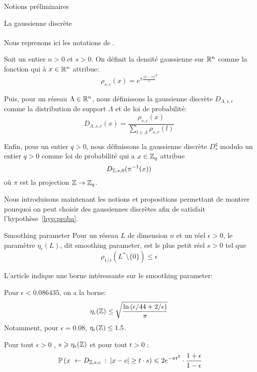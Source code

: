 \begin{section}{Notions préliminaires}
\begin{subsection}{La gaussienne discrète}
	\paragraph{}
Nous reprenons ici les notations de \cite{STOC:GenPeiVai08}.

Soit un entier $n > 0$  et $s > 0$. On définit la densité gaussienne sur $\mathbb{R}^n$ comme la fonction qui à $x\in\mathbb{R}^n$
attribue:
\[\rho_{s,c}(x) = e^{\pi {\frac{||x-c||}{s}}^2} \]

Puis, pour un réseau $\Lambda \in \mathbb{R}^n$, nous définissons la gaussienne discrète $D_{\Lambda,s,c}$ comme la
distribution de support $\Lambda$ et de loi de probabilité: 	
\[ D_{\Lambda, s, c}(x) = \frac{\rho_{s,c}(x)}{\sum_{l\in \Lambda}\rho_{s,c}(l)}\]

Enfin, pour un entier $q > 0$, nous définissons la gaussienne discrète $D^q_{s}$ modulo un entier $q > 0$ comme loi de
probabilité qui a $x \in \mathbb{Z}_q$ attribue 
	\[ D_{\mathbb{Z}, s, 0}(\pi^{-1}(x)) \]
où $\pi$ est la projection $\mathbb{Z} \rightarrow \mathbb{Z}_q$.


Nous introduisons maintenant les notions et propositions permettant de montrer pourquoi on peut choisir 
des gaussiennes discrètes afin de satisfait l'hypothèse~\ref{hyp:proba}.

\begin{definition}{Smoothing parameter}
Pour un réseau $L$ de dimension $n$ et un réel $\epsilon > 0$, le paramètre $\eta_\epsilon(L)$, dit smoothing parameter,
est le plus petit réel $s>0$ tel que 
	\[\rho_{1/s}(L^* \setminus \{0\}) \leqslant \epsilon\]
\end{definition}

L'article \cite{cryptoeprint:2018:786} indique une borne intéressante sur le smoothing parameter:
\begin{prop}
Pour $\epsilon < 0.086435$, on a la borne:
\[\eta_{\epsilon}(\mathbb{Z})  \leq \sqrt{\frac{\ln\left(\epsilon/44 + 2/\epsilon\right)}{\pi}} \]
Notamment, pour $\epsilon = 0.08$, $\eta_\epsilon(\mathbb{Z}) \leq 1.5$.
\end{prop}

\begin{prop}
\label{gaussienne}
Pour tout $\epsilon > 0$ , $s \geqslant \eta_{\epsilon}(\mathbb{Z})$ et pour tout $t>0$ :
\[ \PP\left(x \leftarrow D_{\ZZ, s,c}\: :\: |x-c| \geq t\cdot s\right) \leqslant 2 e^{-\pi t^2}	\cdot \frac{1+\epsilon}{1-\epsilon} \]
\end{prop}


\end{subsection}
\end{section}
